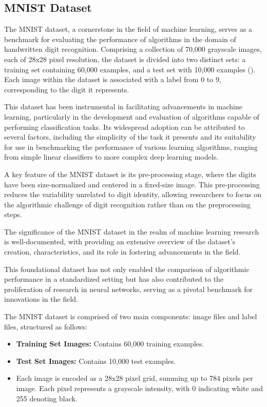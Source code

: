 \subsection{MNIST Dataset}

The MNIST dataset, a cornerstone in the field of machine learning, serves as a benchmark for evaluating the performance of algorithms in the domain of handwritten digit recognition. Comprising a collection of 70,000 grayscale images, each of 28x28 pixel resolution, the dataset is divided into two distinct sets: a training set containing 60,000 examples, and a test set with 10,000 examples (\cite{LeCun1998}). Each image within the dataset is associated with a label from 0 to 9, corresponding to the digit it represents.

This dataset has been instrumental in facilitating advancements in machine learning, particularly in the development and evaluation of algorithms capable of performing classification tasks. Its widespread adoption can be attributed to several factors, including the simplicity of the task it presents and its suitability for use in benchmarking the performance of various learning algorithms, ranging from simple linear classifiers to more complex deep learning models.

A key feature of the MNIST dataset is its pre-processing stage, where the digits have been size-normalized and centered in a fixed-size image. This pre-processing reduces the variability unrelated to digit identity, allowing researchers to focus on the algorithmic challenge of digit recognition rather than on the preprocessing steps.

The significance of the MNIST dataset in the realm of machine learning research is well-documented, with \cite{LeCun1998} providing an extensive overview of the dataset's creation, characteristics, and its role in fostering advancements in the field.

This foundational dataset has not only enabled the comparison of algorithmic performance in a standardized setting but has also contributed to the proliferation of research in neural networks, serving as a pivotal benchmark for innovations in the field.


The MNIST dataset is comprised of two main components: image files and label files, structured as follows:

\begin{itemize}
    \item \textbf{Training Set Images:} Contains 60,000 training examples.
    \item \textbf{Test Set Images:} Contains 10,000 test examples.
    \item Each image is encoded as a 28x28 pixel grid, summing up to 784 pixels per image. Each pixel represents a grayscale intensity, with 0 indicating white and 255 denoting black.
\end{itemize}

